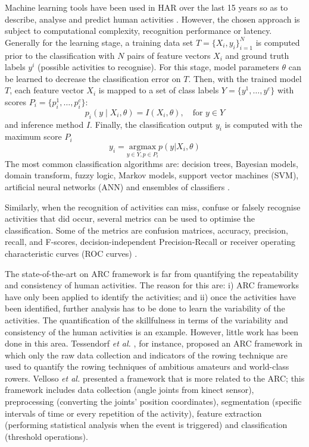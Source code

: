 \documentclass[10pt,journal,compsoc]{IEEEtran}
\begin{document}
Machine learning tools have been used in HAR over 
the last 15 years so as to describe, analyse and predict human 
activities \cite{bulling2014}. However, the chosen approach is subject to 
computational complexity, recognition performance or latency.
Generally for the learning stage, a training data set 
$T = \{ X_i, y_i \}  ^N _ {i=1}$ is computed prior to the classification 
with $N$ pairs of feature vectors $X_i$ and ground truth labels 
$y^i$ (possible activities to recognise). For this stage, model 
parameters $\theta$ can be learned to decrease the classification 
error on $T$. Then, with the trained model $T$, each feature 
vector $X_i$  is mapped to a set of class labels $Y= \{ y^1, \dots , y^c \}$ 
with scores $P_i = \{ p^1_i, \dots, p^c_i \}$:
\begin{equation}
p_i ( y \mid X_i, \theta) = I (X_i, \theta), \quad \mbox{for } y \in Y
\end{equation} 
and inference method $I$. Finally, the classification output $y_i$ 
is computed with the maximum score $P_i$
\begin{equation}
y_i  = 
\underset{ y \in Y, p \in P_i }{\text{argmax}}   p(y | X_i, \theta)
\end{equation} 
The most common classification algorithms are: decision 
trees, Bayesian models, domain transform, fuzzy logic, 
Markov models, support vector machines (SVM), artificial 
neural networks (ANN) and ensembles of classifiers \cite{Lara2013}.

Similarly, when the recognition of activities can miss,
confuse or falsely recognise activities that did occur, several 
metrics can be used to optimise the classification. Some 
of the metrics are confusion matrices, accuracy, precision, 
recall, and F-scores, decision-independent Precision-Recall 
or receiver operating characteristic curves (ROC curves) \cite{bulling2014}.

The state-of-the-art on ARC framework is far from 
quantifying the repeatability and consistency of human activities.
The reason for this are: i) ARC frameworks have only been
applied to identify the activities; and ii) once the activities
have been identified, further analysis has to be done to
learn the variability of the activities. The quantification of 
the skillfulness in terms of the variability and consistency 
of the human activities is an example. However, little work
has been done in this area. Tessendorf \textit{et al.} \cite{Tessendorf2011}, for instance,
proposed an ARC framework in which only the raw data 
collection and indicators of the rowing technique are used 
to quantify the rowing techniques of ambitious amateurs 
and world-class rowers. Velloso \textit{et al.} \cite{Velloso2013a,Velloso2013b} presented
a framework that is more related to the ARC; this framework
includes data collection (angle joints from kinect sensor),
preprocessing (converting the joints' position coordinates),
segmentation (specific intervals of time or every repetition of
the activity), feature extraction (performing statistical analysis
when the event is triggered) and classification (threshold
operations).
\end{document}
